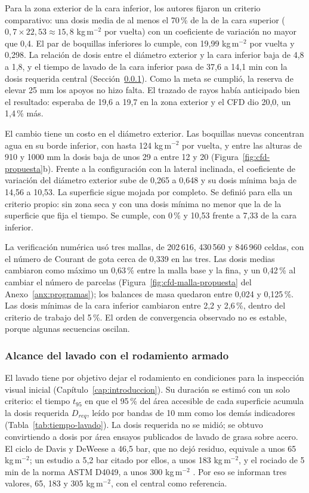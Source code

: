 Para la zona exterior de la cara inferior, los autores fijaron un criterio comparativo: una dosis media de al menos el 70\,\% de la de la cara superior ($0{,}7\times22{,}53\approx15{,}8$ kg\,m$^{-2}$ por vuelta) con un coeficiente de variación no mayor que 0,4. El par de boquillas inferiores lo cumple, con 19,99 kg\,m$^{-2}$ por vuelta y 0,298. La relación de dosis entre el diámetro exterior y la cara inferior baja de 4,8 a 1,8, y el tiempo de lavado de la cara inferior pasa de 37,6 a 14,1 min con la dosis requerida central (Sección~\ref{sec:alcance-lavado}). Como la meta se cumplió, la reserva de elevar 25 mm los apoyos no hizo falta. El trazado de rayos había anticipado bien el resultado: esperaba de 19,6 a 19,7 en la zona exterior y el CFD dio 20,0, un 1,4\,\% más.

El cambio tiene un costo en el diámetro exterior. Las boquillas nuevas concentran agua en su borde inferior, con hasta 124 kg\,m$^{-2}$ por vuelta, y entre las alturas de 910 y 1000 mm la dosis baja de unos 29 a entre 12 y 20 (Figura~\ref{fig:cfd-propuesta}b). Frente a la configuración con la lateral inclinada, el coeficiente de variación del diámetro exterior sube de 0,265 a 0,648 y su dosis mínima baja de 14,56 a 10,53. La superficie sigue mojada por completo. Se definió para ella un criterio propio: sin zona seca y con una dosis mínima no menor que la de la superficie que fija el tiempo. Se cumple, con 0\,\% y 10,53 frente a 7,33 de la cara inferior.

La verificación numérica usó tres mallas, de 202\,616, 430\,560 y 846\,960 celdas, con el número de Courant de gota cerca de 0,339 en las tres. Las dosis medias cambiaron como máximo un 0,63\,\% entre la malla base y la fina, y un 0,42\,\% al cambiar el número de parcelas (Figura~\ref{fig:cfd-malla-propuesta} del Anexo~\ref{anx:programas}); los balances de masa quedaron entre 0,024 y 0,125\,\%. Las dosis mínimas de la cara inferior cambiaron entre 2,2 y 2,6\,\%, dentro del criterio de trabajo del 5\,\%. El orden de convergencia observado no es estable, porque algunas secuencias oscilan.

\subsubsection{Alcance del lavado con el rodamiento armado}
\label{sec:alcance-lavado}

El lavado tiene por objetivo dejar el rodamiento en condiciones para la inspección visual inicial (Capítulo~\ref{cap:introduccion}). Su duración se estimó con un solo criterio: el tiempo $t_{95}$ en que el 95\,\% del área accesible de cada superficie acumula la dosis requerida $D_{req}$, leído por bandas de 10 mm como los demás indicadores (Tabla~\ref{tab:tiempo-lavado}). La dosis requerida no se midió; se obtuvo convirtiendo a dosis por área ensayos publicados de lavado de grasa sobre acero. El ciclo de Davis y DeWeese a 46,5 bar, que no dejó residuo, equivale a unos 65 kg\,m$^{-2}$; un estudio a 5,2 bar citado por ellos, a unos 183 kg\,m$^{-2}$, y el rociado de 5 min de la norma ASTM D4049, a unos 300 kg\,m$^{-2}$ \cite{davis1995,astmd4049}. Por eso se informan tres valores, 65, 183 y 305 kg\,m$^{-2}$, con el central como referencia.


